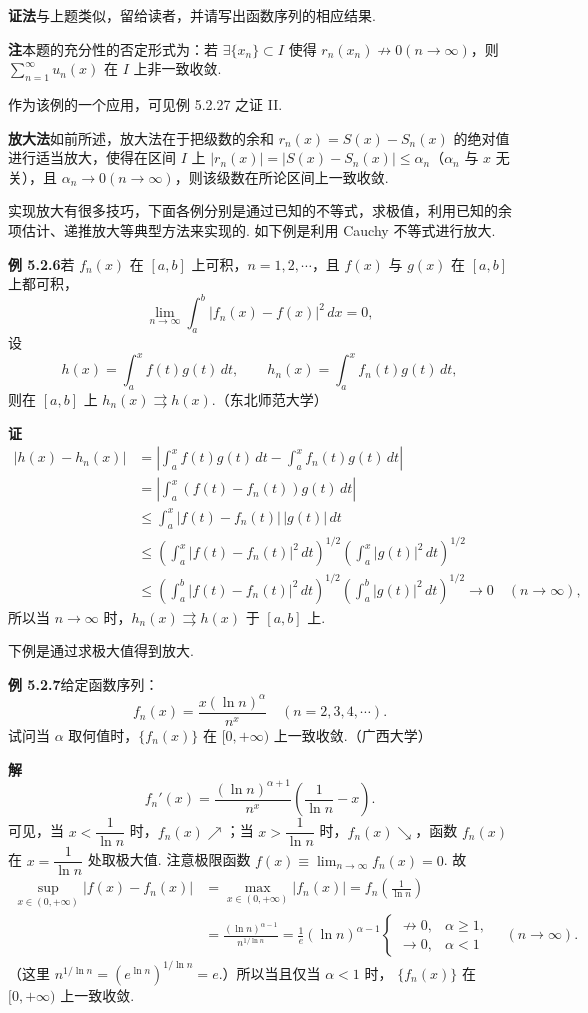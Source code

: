 \documentclass[UTF8,12pt,a4paper,fontset=fandol]{ctexart}
\begin{document}
\noindent\textbf{证法}\quad 与上题类似，留给读者，并请写出函数序列的相应结果.

\noindent\textbf{注}\quad 本题的充分性的否定形式为：若 $\exists\{x_n\}\subset I$ 使得
$r_n(x_n)\not\to0(n\to\infty)$，则
$\displaystyle\sum_{n=1}^{\infty}u_n(x)$ 在 $I$ 上非一致收敛.

作为该例的一个应用，可见例 5.2.27 之证 II.

\noindent\textbf{放大法}\quad 如前所述，放大法在于把级数的余和
$r_n(x)=S(x)-S_n(x)$ 的绝对值进行适当放大，使得在区间 $I$ 上
$|r_n(x)|=|S(x)-S_n(x)|\le\alpha_n$（$\alpha_n$ 与 $x$ 无关），且
$\alpha_n\to0(n\to\infty)$，则该级数在所论区间上一致收敛.

实现放大有很多技巧，下面各例分别是通过已知的不等式，求极值，利用已知的余项估计、递推放大等典型方法来实现的. 如下例是利用 Cauchy 不等式进行放大.

\noindent\textbf{例 5.2.6}\quad 若 $f_n(x)$ 在 $[a,b]$ 上可积，$n=1,2,\cdots$，且
$f(x)$ 与 $g(x)$ 在 $[a,b]$ 上都可积，
\[
  \lim_{n\to\infty}\int_a^b|f_n(x)-f(x)|^2\,dx=0,
\]
设
\[
  h(x)=\int_a^x f(t)g(t)\,dt,\qquad
  h_n(x)=\int_a^x f_n(t)g(t)\,dt,
\]
则在 $[a,b]$ 上 $h_n(x)\rightrightarrows h(x)$.（东北师范大学）

\noindent\textbf{证}\quad
\[
\begin{aligned}
|h(x)-h_n(x)|
&=\left|\int_a^x f(t)g(t)\,dt-\int_a^x f_n(t)g(t)\,dt\right|\\
&=\left|\int_a^x(f(t)-f_n(t))g(t)\,dt\right|\\
&\le\int_a^x|f(t)-f_n(t)|\,|g(t)|\,dt\\
&\le\left(\int_a^x|f(t)-f_n(t)|^2\,dt\right)^{1/2}
     \left(\int_a^x|g(t)|^2\,dt\right)^{1/2}\\
&\le\left(\int_a^b|f(t)-f_n(t)|^2\,dt\right)^{1/2}
     \left(\int_a^b|g(t)|^2\,dt\right)^{1/2}\to0\quad(n\to\infty),
\end{aligned}
\]
所以当 $n\to\infty$ 时，$h_n(x)\rightrightarrows h(x)$ 于 $[a,b]$ 上.

下例是通过求极大值得到放大.

\noindent\textbf{例 5.2.7}\quad 给定函数序列：
\[
  f_n(x)=\frac{x(\ln n)^\alpha}{n^x}\quad(n=2,3,4,\cdots).
\]
试问当 $\alpha$ 取何值时，$\{f_n(x)\}$ 在 $[0,+\infty)$ 上一致收敛.（广西大学）

\noindent\textbf{解}\quad
\[
  f_n'(x)=\frac{(\ln n)^{\alpha+1}}{n^x}\left(\frac1{\ln n}-x\right).
\]
可见，当 $x<\dfrac1{\ln n}$ 时，$f_n(x)\nearrow$；当
$x>\dfrac1{\ln n}$ 时，$f_n(x)\searrow$，函数 $f_n(x)$ 在
$x=\dfrac1{\ln n}$ 处取极大值. 注意极限函数
$f(x)\equiv\lim_{n\to\infty}f_n(x)=0$. 故
\[
\begin{aligned}
\sup_{x\in(0,+\infty)}|f(x)-f_n(x)|
&=\max_{x\in(0,+\infty)}|f_n(x)|
 =f_n\left(\frac1{\ln n}\right)\\
&=\frac{(\ln n)^{\alpha-1}}{n^{1/\ln n}}
 =\frac1e(\ln n)^{\alpha-1}
\begin{cases}
\not\to0, & \alpha\ge1,\\
\to0, & \alpha<1
\end{cases}
\quad(n\to\infty).
\end{aligned}
\]
（这里 $n^{1/\ln n}=(e^{\ln n})^{1/\ln n}=e$.）所以当且仅当 $\alpha<1$ 时，
$\{f_n(x)\}$ 在 $[0,+\infty)$ 上一致收敛.
\end{document}
